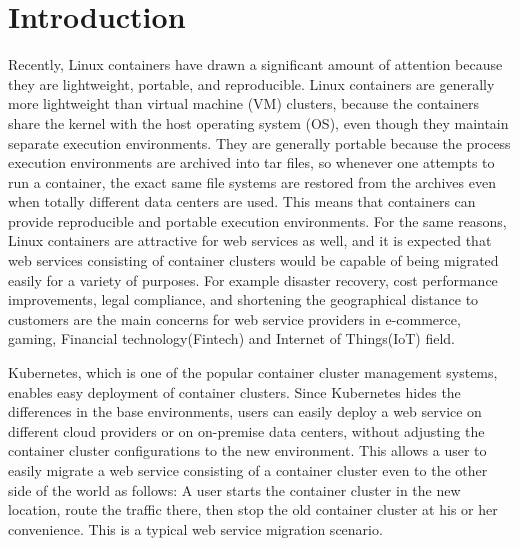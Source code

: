 \section{Introduction}

Recently, Linux containers have drawn a significant amount of attention because they are lightweight, portable, and reproducible.
Linux containers are generally more lightweight than virtual machine (VM) clusters, because the containers share the kernel with the host operating system (OS), even though they maintain separate execution environments.
They are generally portable because the process execution environments are archived into tar files,
so whenever one attempts to run a container, the exact same file systems are restored from the archives
even when totally different data centers are used.
This means that containers can provide reproducible and portable execution environments.
%
For the same reasons, Linux containers are attractive for web services as well,
and it is expected that web services consisting of container clusters would be
capable of being migrated easily for a variety of purposes. For example disaster recovery,
cost performance improvements, legal compliance, and shortening the geographical distance to customers
are the main concerns for web service providers in e-commerce, gaming, Financial technology(Fintech) and Internet of Things(IoT) field.
%

Kubernetes\cite{K8s2017}, which is one of the popular container cluster management systems, 
enables easy deployment of container clusters.
Since Kubernetes hides the differences in the base environments, users can easily deploy a web service on different 
cloud providers or on on-premise data centers, without adjusting the container cluster configurations to the new environment. 
This allows a user to easily migrate a web service consisting of a container cluster even to the other side of the world as follows: 
A user starts the container cluster in the new location, route the traffic there, 
then stop the old container cluster at his or her convenience.
This is a typical web service migration scenario.

